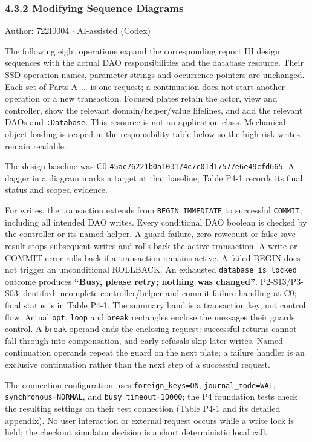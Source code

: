\subsubsection*{4.3.2 Modifying Sequence Diagrams}
Author: 722I0004 \ensuremath{\cdot} AI-assisted (Codex)

The following eight operations expand the corresponding report III design sequences with the actual DAO responsibilities and the database resource. Their SSD operation names, parameter strings and occurrence pointers are unchanged. Each set of Parts A--\ldots{} is one request; a continuation does not start another operation or a new transaction. Focused plates retain the actor, view and controller, show the relevant domain/helper/value lifelines, and add the relevant DAOs and \texttt{:Database}. This resource is not an application class. Mechanical object loading is scoped in the responsibility table below so the high-risk writes remain readable.

The design baseline was C0 \texttt{45ac76221b0a103174c7c01d17577e6e49cfd665}. A dagger in a diagram marks a target at that baseline; Table P4-1 records its final status and scoped evidence.

For writes, the transaction extends from \texttt{BEGIN IMMEDIATE} to successful \texttt{COMMIT}, including all intended DAO writes. Every conditional DAO boolean is checked by the controller or its named helper. A guard failure, zero rowcount or false save result stops subsequent writes and rolls back the active transaction. A write or COMMIT error rolls back if a transaction remains active. A failed BEGIN does not trigger an unconditional ROLLBACK. An exhausted \texttt{database is locked} outcome produces \textbf{``Busy, please retry; nothing was changed''}. P2-S13/P3-S03 identified incomplete controller/helper and commit-failure handling at C0; final status is in Table P4-1. The summary band is a transaction key, not control flow. Actual \texttt{opt}, \texttt{loop} and \texttt{break} rectangles enclose the messages their guards control. A \texttt{break} operand ends the enclosing request: successful returns cannot fall through into compensation, and early refusals skip later writes. Named continuation operands repeat the guard on the next plate; a failure handler is an exclusive continuation rather than the next step of a successful request.

The connection configuration uses \texttt{foreign\_\allowbreak{}keys=ON}, \texttt{journal\_\allowbreak{}mode=WAL}, \texttt{synchronous=NORMAL}, and \texttt{busy\_\allowbreak{}timeout=10000}; the P4 foundation tests check the resulting settings on their test connection (Table P4-1 and its detailed appendix). No user interaction or external request occurs while a write lock is held; the checkout simulator decision is a short deterministic local call.

